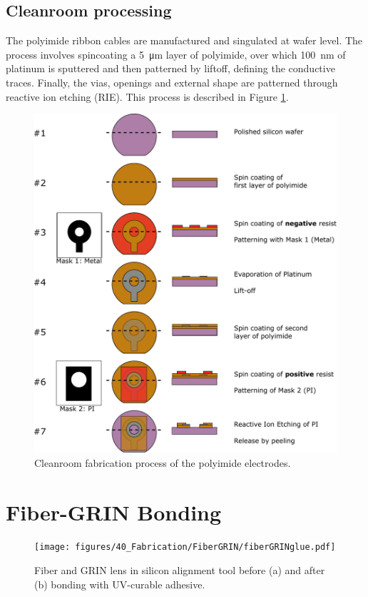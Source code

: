 \subsection{Cleanroom processing}
The polyimide ribbon cables are manufactured and singulated at wafer level. The process involves spincoating a \SI{5}{\micro\meter} layer of polyimide, over which \SI{100}{\nano\meter} of platinum is sputtered and then patterned by liftoff, defining the conductive traces. Finally, the vias, openings and external shape are patterned through reactive ion etching (RIE). This process is described in Figure \ref{fig:piProcess}.


\begin{figure}[h!]\centering \includegraphics[width=12cm]{figures/40_Fabrication/PI/processV.pdf}
      \caption{Cleanroom fabrication process of the polyimide electrodes.}
      \label{fig:piProcess}
\end{figure}

\clearpage
\section{Fiber-GRIN Bonding}
\begin{figure}[h!]\centering \texttt{[image: figures/40\_Fabrication/FiberGRIN/fiberGRINglue.pdf]}
      \caption{Fiber and GRIN lens in silicon alignment tool before (a) and after (b) bonding with UV-curable adhesive.}
      \label{fig:fiberGRINglue}
\end{figure}

